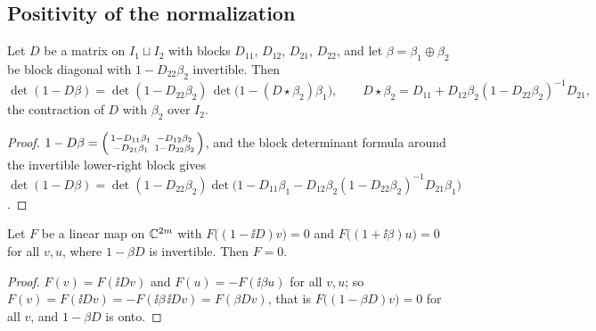 \subsection{Positivity of the normalization}
\label{sec:normalization}

\begin{lemma}\label{lem:schur}
Let $D$ be a matrix on $I_1\sqcup I_2$ with blocks $D_{11}$, $D_{12}$, $D_{21}$, $D_{22}$,
and let $\beta=\beta_1\oplus\beta_2$ be block diagonal with $1-D_{22}\beta_2$ invertible. Then
\[
 \det(1-D\beta)=\det(1-D_{22}\beta_2)\,\det\bigl(1-(D\star\beta_2)\beta_1\bigr),\qquad
 D\star\beta_2=D_{11}+D_{12}\beta_2(1-D_{22}\beta_2)^{-1}D_{21},
\]
the contraction of $D$ with $\beta_2$ over $I_2$.
\end{lemma}
\begin{proof}
$1-D\beta=\begin{psmallmatrix}1-D_{11}\beta_1&-D_{12}\beta_2\\-D_{21}\beta_1&1-D_{22}\beta_2\end{psmallmatrix}$,
and the block determinant formula around the invertible lower-right block gives
$\det(1-D\beta)=\det(1-D_{22}\beta_2)\det\bigl(1-D_{11}\beta_1-D_{12}\beta_2(1-D_{22}\beta_2)^{-1}D_{21}\beta_1\bigr)$.
\end{proof}

\begin{lemma}\label{lem:kernel}
Let $F$ be a linear map on $\mathbb C^{2m}$ with $F\bigl((1-\ii D)v\bigr)=0$ and $F\bigl((1+\ii\beta)u\bigr)=0$
for all $v,u$, where $1-\beta D$ is invertible. Then $F=0$.
\end{lemma}
\begin{proof}
$F(v)=F(\ii Dv)$ and $F(u)=-F(\ii\beta u)$ for all $v,u$; so
$F(v)=F(\ii Dv)=-F(\ii\beta\,\ii Dv)=F(\beta Dv)$, that is $F\bigl((1-\beta D)v\bigr)=0$ for all
$v$, and $1-\beta D$ is onto.
\end{proof}

